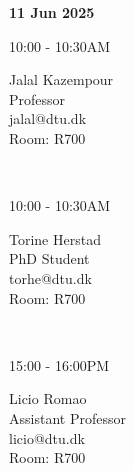 \documentclass[10pt]{extarticle}
\begin{document}
\begin{center}
\begin{minipage}[t]{0.75\columnwidth}
\begin{minipage}[t]{0.3333333333333333\columnwidth}
                \begin{flushleft}
                    \textbf{11 Jun 2025} \\
                \end{flushleft}
            \begin{minipage}[t]{0.3\columnwidth}
                10:00 - 10:30AM
            \end{minipage}%
            \begin{minipage}[t]{0.65\columnwidth}
                Jalal Kazempour \\
                Professor \\
                jalal@dtu.dk \\
                Room: R700 \\
            \end{minipage}
            \vspace{0.01cm} \\
            \begin{minipage}[t]{0.3\columnwidth}
                10:00 - 10:30AM
            \end{minipage}%
            \begin{minipage}[t]{0.65\columnwidth}
                Torine Herstad \\
                PhD Student \\
                torhe@dtu.dk \\
                Room: R700 \\
            \end{minipage}
            \vspace{0.01cm} \\
            \begin{minipage}[t]{0.3\columnwidth}
                15:00 - 16:00PM
            \end{minipage}%
            \begin{minipage}[t]{0.65\columnwidth}
                Licio Romao \\
                Assistant Professor \\
                licio@dtu.dk \\
                Room: R700 \\
            \end{minipage}
            \vspace{0.01cm} \\
        \end{minipage}%
        \vrule width 1pt
        \vspace{0.01cm}

\end{minipage}
\end{center}
\end{document}
